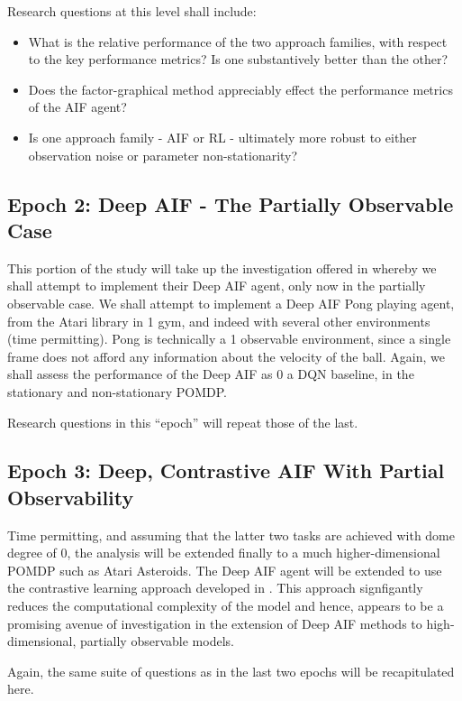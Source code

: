 \documentclass[12pt, twoside]{report}
\begin{document}
Research questions at this level shall include:
\begin{itemize}
\item What is the relative performance of the two approach families, with respect to the key performance metrics? Is one substantively better than the other?
\item Does the factor-graphical method appreciably effect the performance metrics of the AIF agent?
\item Is one approach family - AIF or RL - ultimately more robust to either observation noise or parameter non-stationarity?
\end{itemize}  
   
\subsection{Epoch 2: Deep AIF - The Partially Observable Case}
This portion of the study will take up the investigation offered in \textcite{Scaling-AIF} whereby we shall attempt to implement their Deep AIF agent, only now in the partially observable case. 
We shall attempt to implement a Deep AIF Pong playing agent, from the Atari library in 1 gym, and indeed with several other environments (time permitting). Pong is technically a 1 observable environment, since a single frame does not afford any information about the velocity of the ball. Again, we shall assess the performance of the Deep AIF as 0 a DQN baseline, in the stationary and non-stationary POMDP.  

Research questions in this ``epoch''  will repeat those of the last.
 
\subsection{Epoch 3: Deep, Contrastive AIF With Partial Observability}
Time permitting, and assuming that the latter two tasks are achieved with dome degree of 0, the analysis will be extended finally to a much higher-dimensional POMDP such as Atari Asteroids. The Deep AIF agent will be extended to use the contrastive learning approach developed in \textcite{Contrastive-AIF}. This approach signfigantly reduces the computational complexity of the model and hence, appears to be a promising avenue of investigation in the extension of Deep AIF methods to high-dimensional, partially observable models.

Again, the same suite of questions as in the last two epochs will be recapitulated here.    
\end{document}
